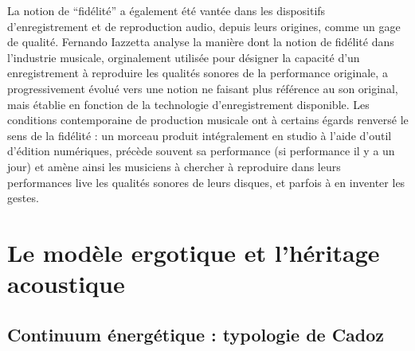 \noindent La notion de ``fidélité'' a également été vantée dans les dispositifs d'enregistrement et de reproduction audio, depuis leurs origines, comme un gage de qualité. Fernando Iazzetta \cite{iazzetta_meaning_2000} analyse la manière dont la notion de fidélité dans l'industrie musicale, orginalement utilisée pour désigner la capacité d'un enregistrement à reproduire les qualités sonores de la performance originale, a progressivement évolué vers une notion ne faisant plus référence au son original, mais établie en fonction de la technologie d'enregistrement disponible. Les conditions contemporaine de production musicale ont à certains égards renversé le sens de la fidélité : un morceau produit intégralement en studio à l'aide d'outil d'édition numériques, précède souvent sa performance (si performance il y a un jour) et amène ainsi les musiciens à chercher à reproduire dans leurs performances live les qualités sonores de leurs disques, et parfois à en inventer les gestes.


\section{Le modèle ergotique et l'héritage acoustique}
\label{sec:gesture:ergotic}

\subsection{Continuum énergétique : typologie de Cadoz}

